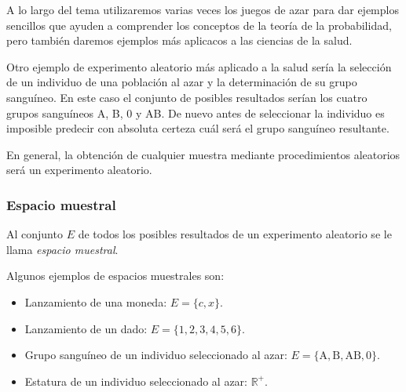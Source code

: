 \begin{frame}
{A lo largo del tema utilizaremos varias veces los juegos de azar para dar ejemplos sencillos que ayuden a comprender los conceptos de la
teoría de la probabilidad, pero también daremos ejemplos más aplicacos a las ciencias de la salud. 

Otro ejemplo de experimento aleatorio más aplicado a la salud sería la selección de un individuo de una población al azar y la determinación
de su grupo sanguíneo. En este caso el conjunto de posibles resultados serían los cuatro grupos sanguíneos A, B, 0 y AB. De nuevo antes de
seleccionar la individuo es imposible predecir con absoluta certeza cuál será el grupo sanguíneo resultante. 

En general, la obtención de cualquier muestra mediante procedimientos aleatorios será un experimento aleatorio.  
}
\end{frame}


\begin{frame}
\frametitle{Espacio muestral}
\begin{definicion}
Al conjunto $E$ de todos los posibles resultados de un experimento aleatorio se le llama \emph{espacio muestral}.
\end{definicion}

Algunos ejemplos de espacios muestrales son:
\begin{itemize}
\item Lanzamiento de una moneda: $E=\{c,x\}$.
\item Lanzamiento de un dado: $E=\{1,2,3,4,5,6\}$.
\item Grupo sanguíneo de un individuo seleccionado al azar: $E=\{\mbox{A},\mbox{B},\mbox{AB},\mbox{0}\}$.
\item Estatura de un individuo seleccionado al azar: $\mathbb{R}^+$.
\end{itemize}

\end{frame}


